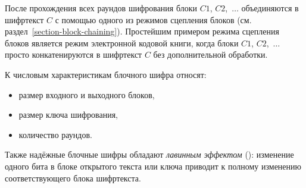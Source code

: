 После прохождения всех раундов шифрования блоки $C1$, $C2$,~$\dots$ объединяются в шифртекст $C$ с помощью одного из режимов сцепления блоков (см. раздел~\ref{section-block-chaining}). Простейшим примером режима сцепления блоков является режим электронной кодовой книги, когда блоки $C1$, $C2$,~$\dots$ просто конкатенируются в шифртекст $C$ без дополнительной обработки.

К числовым характеристикам блочного шифра относят:
\begin{itemize}
	\item размер входного и выходного блоков,
	\item размер ключа шифрования,
	\item количество раундов.
\end{itemize}

Также надёжные блочные шифры обладают \emph{лавинным эффектом} (): изменение одного бита в блоке открытого текста или ключа приводит к полному изменению соответствующего блока шифртекста.
